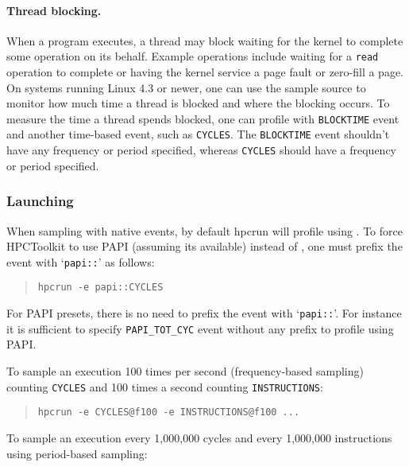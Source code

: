 \paragraph{Thread blocking.} When a program executes, 
a thread may block waiting for the kernel to complete some operation on its behalf.
Example operations include waiting for a {\tt read} operation to complete or having the
kernel service a page fault or zero-fill a page. On systems running Linux 4.3 or newer, one can use the \perfevents{} sample source to monitor how much time a thread is blocked and where the blocking occurs. To measure
the time a thread spends blocked, one can profile with \verb|BLOCKTIME| event and
another time-based event, such as \verb|CYCLES|. The \verb|BLOCKTIME| event shouldn't have any frequency or period specified, whereas \verb|CYCLES| should have a frequency or period specified.

\subsubsection{Launching}
\label{sec:perf-launching}

When sampling with native events, by default hpcrun will profile using \perfevents{}. 
To force HPCToolkit to use PAPI (assuming it\textquotesingle s available) instead of \perfevents{}, 
one must prefix the event with \lq{\verb|papi::|}\rq{} as follows:

\begin{quote}
\begin{verbatim}
hpcrun -e papi::CYCLES
\end{verbatim}
\end{quote}

For PAPI presets, there is no need to prefix the event with
 \lq{\verb|papi::|}\rq. For instance it is sufficient to specify \verb|PAPI_TOT_CYC| event
without any prefix to profile using PAPI.

To sample an execution 100 times per second (frequency-based sampling) counting \verb|CYCLES| 
and 100 times a second counting \verb|INSTRUCTIONS|:

\begin{quote}
\begin{verbatim}
hpcrun -e CYCLES@f100 -e INSTRUCTIONS@f100 ...
\end{verbatim}
\end{quote}

To sample an execution every 1,000,000 cycles and every 1,000,000 instructions using period-based sampling:

